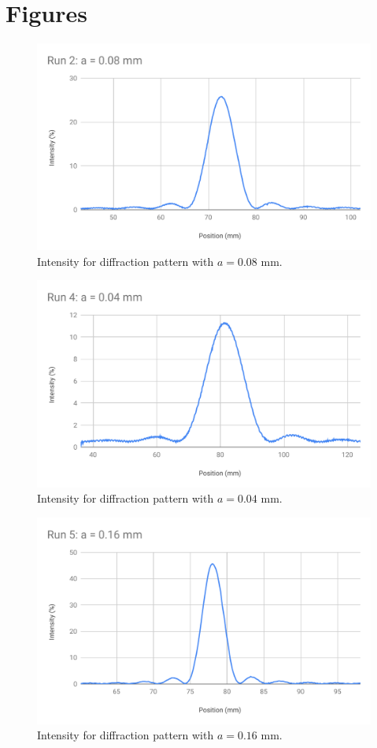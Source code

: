 \section{Figures}
\begin{figure}[ht!]
	\centering
	\includegraphics[scale=0.74]{image/11-diffraction/chart1.pdf}
	\caption{Intensity for diffraction pattern with $a = 0.08$ mm.}
	\label{figure.11.chart1}
\end{figure}
\begin{figure}[ht!]
	\centering
	\includegraphics[scale=0.74]{image/11-diffraction/chart2.pdf}
	\caption{Intensity for diffraction pattern with $a = 0.04$ mm.}
	\label{figure.11.chart2}
\end{figure}
\begin{figure}[ht!]
	\centering
	\includegraphics[scale=0.74]{image/11-diffraction/chart3.pdf}
	\caption{Intensity for diffraction pattern with $a = 0.16$ mm.}
	\label{figure.11.chart3}
\end{figure}
